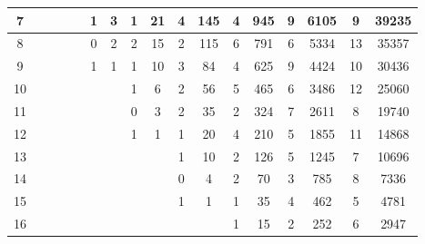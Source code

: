 \documentclass{article}
\numberwithin{equation}{section}
\begin{document}
\begin{table}[htb!]
{\begin{tabular}{|c|cc|cc|cc|cc|cc|cc|cc|cc|}
7 & \multicolumn{1}{c|}{} &  & \multicolumn{1}{c|}{} &  & \multicolumn{1}{c|}{1} & 3 & \multicolumn{1}{c|}{1} & 21 & \multicolumn{1}{c|}{4} & 145 & \multicolumn{1}{c|}{4} & 945 & \multicolumn{1}{c|}{9} & 6105 & \multicolumn{1}{c|}{9} & 39235 \\ \hline
8 & \multicolumn{1}{c|}{} &  & \multicolumn{1}{c|}{} &  & \multicolumn{1}{c|}{0} & 2 & \multicolumn{1}{c|}{2} & 15 & \multicolumn{1}{c|}{2} & 115 & \multicolumn{1}{c|}{6} & 791 & \multicolumn{1}{c|}{6} & 5334 & \multicolumn{1}{c|}{13} & 35357 \\ \hline
9 & \multicolumn{1}{c|}{} &  & \multicolumn{1}{c|}{} &  & \multicolumn{1}{c|}{1} & 1 & \multicolumn{1}{c|}{1} & 10 & \multicolumn{1}{c|}{3} & 84 & \multicolumn{1}{c|}{4} & 625 & \multicolumn{1}{c|}{9} & 4424 & \multicolumn{1}{c|}{10} & 30436 \\ \hline
10 & \multicolumn{1}{c|}{} &  & \multicolumn{1}{c|}{} &  & \multicolumn{1}{c|}{} &  & \multicolumn{1}{c|}{1} & 6 & \multicolumn{1}{c|}{2} & 56 & \multicolumn{1}{c|}{5} & 465 & \multicolumn{1}{c|}{6} & 3486 & \multicolumn{1}{c|}{12} & 25060 \\ \hline
11 & \multicolumn{1}{c|}{} &  & \multicolumn{1}{c|}{} &  & \multicolumn{1}{c|}{} &  & \multicolumn{1}{c|}{0} & 3 & \multicolumn{1}{c|}{2} & 35 & \multicolumn{1}{c|}{2} & 324 & \multicolumn{1}{c|}{7} & 2611 & \multicolumn{1}{c|}{8} & 19740 \\ \hline
12 & \multicolumn{1}{c|}{} &  & \multicolumn{1}{c|}{} &  & \multicolumn{1}{c|}{} &  & \multicolumn{1}{c|}{1} & 1 & \multicolumn{1}{c|}{1} & 20 & \multicolumn{1}{c|}{4} & 210 & \multicolumn{1}{c|}{5} & 1855 & \multicolumn{1}{c|}{11} & 14868 \\ \hline
13 & \multicolumn{1}{c|}{} &  & \multicolumn{1}{c|}{} &  & \multicolumn{1}{c|}{} &  & \multicolumn{1}{c|}{} &  & \multicolumn{1}{c|}{1} & 10 & \multicolumn{1}{c|}{2} & 126 & \multicolumn{1}{c|}{5} & 1245 & \multicolumn{1}{c|}{7} & 10696 \\ \hline
14 & \multicolumn{1}{c|}{} &  & \multicolumn{1}{c|}{} &  & \multicolumn{1}{c|}{} &  & \multicolumn{1}{c|}{} &  & \multicolumn{1}{c|}{0} & 4 & \multicolumn{1}{c|}{2} & 70 & \multicolumn{1}{c|}{3} & 785 & \multicolumn{1}{c|}{8} & 7336 \\ \hline
15 & \multicolumn{1}{c|}{} &  & \multicolumn{1}{c|}{} &  & \multicolumn{1}{c|}{} &  & \multicolumn{1}{c|}{} &  & \multicolumn{1}{c|}{1} & 1 & \multicolumn{1}{c|}{1} & 35 & \multicolumn{1}{c|}{4} & 462 & \multicolumn{1}{c|}{5} & 4781 \\ \hline
16 & \multicolumn{1}{c|}{} &  & \multicolumn{1}{c|}{} &  & \multicolumn{1}{c|}{} &  & \multicolumn{1}{c|}{} &  & \multicolumn{1}{c|}{} &  & \multicolumn{1}{c|}{1} & 15 & \multicolumn{1}{c|}{2} & 252 & \multicolumn{1}{c|}{6} & 2947 \\ \hline

\end{tabular}}
\end{table}
\end{document}
